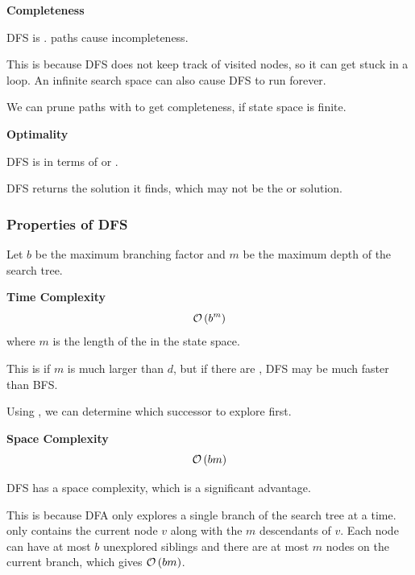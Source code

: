 \begin{listu}
    \item \textbf{Completeness}
    
    \begin{listu}
        \item DFS is .  paths cause incompleteness.
        \item This is because DFS does not keep track of visited nodes, so it can get stuck in a loop. An infinite search space can also cause DFS to run forever.
        \item We can prune paths with  to get completeness, if state space is finite. 
    \end{listu}

    \item \textbf{Optimality}
    
    \begin{listu}
        \item DFS is  in terms of  or .
        \item DFS returns the  solution it finds, which may not be the  or  solution.
    \end{listu}
\end{listu}

\subsubsection{Properties of DFS}

Let $b$ be the maximum branching factor and $m$ be the maximum depth of the search tree.

\begin{listu}
    \item \textbf{Time Complexity} \[
        \mathcal{O}\left(b^m\right)
    \] where $m$ is the length of the  in the state space.

    \begin{listu}
        \item This is  if $m$ is much larger than $d$, but if there are , DFS may be much faster than BFS.
        \item Using , we can determine which successor to explore first. 
    \end{listu}

    \item \textbf{Space Complexity} \[
        \mathcal{O}\left(bm\right)
    \]
    
    DFS has a  space complexity, which is a significant advantage. 

    This is because DFA only explores a single branch of the search tree at a time. \Frontier only contains the current node $v$ along with the $m$ descendants of $v$.  Each node can have at most $b$ unexplored siblings and there are at most $m$ nodes on the current branch, which gives $\mathcal{O}\left(bm\right)$.
\end{listu}

